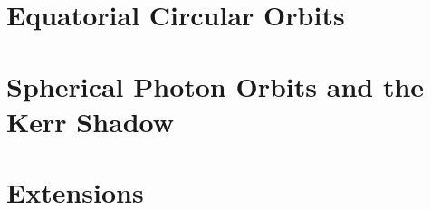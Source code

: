 \section{Equatorial Circular Orbits}\label{sec:equatorial-circular-orbits}

\section{Spherical Photon Orbits and the Kerr Shadow}\label{sec:spherical-photon-orbits-and-the-kerr-sha}

\section{Extensions\optmark}\label{sec:extensions}
